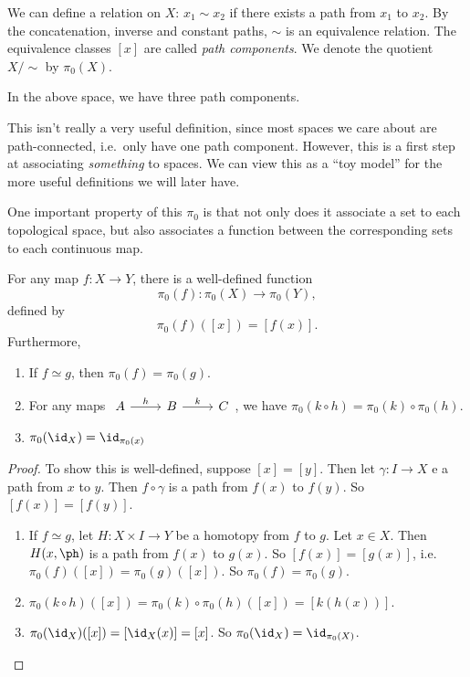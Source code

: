 \documentclass[a4paper]{article}
\begin{document}
\begin{defi}
  We can define a relation on $X$: $x_1 \sim x_2$ if there exists a path from $x_1$ to $x_2$. By the concatenation, inverse and constant paths, $\sim$ is an equivalence relation. The equivalence classes $[x]$ are called \emph{path components}. We denote the quotient $X/{\sim}$ by $\pi_0(X)$.
\end{defi}
\begin{center}
\end{center}
In the above space, we have three path components.

This isn't really a very useful definition, since most spaces we care about are path-connected, i.e.\ only have one path component. However, this is a first step at associating \emph{something} to spaces. We can view this as a ``toy model'' for the more useful definitions we will later have.

One important property of this $\pi_0$ is that not only does it associate a set to each topological space, but also associates a function between the corresponding sets to each continuous map.
\begin{prop}
  For any map $f: X\to Y$, there is a well-defined function
  \[
    \pi_0(f): \pi_0(X) \to \pi_0(Y),
  \]
  defined by
  \[
    \pi_0(f)([x]) = [f(x)].
  \]
  Furthermore,
  \begin{enumerate}
    \item If $f\simeq g$, then $\pi_0(f) = \pi_0(g)$.
    \item For any maps $\begin{tikzcd} A \ar[r, "h"] & B\ar[r, "k"] & C\end{tikzcd}$, we have $\pi_0(k\circ h) = \pi_0(k)\circ \pi_0 (h)$.
    \item $\pi_0(\id_X) = \id_{\pi_0(x)}$
  \end{enumerate}
\end{prop}

\begin{proof}
  To show this is well-defined, suppose $[x] = [y]$. Then let $\gamma: I \to X$ e a path from $x$ to $y$. Then $f \circ \gamma$ is a path from $f(x)$ to $f(y)$. So $[f(x)] = [f(y)]$.
  \begin{enumerate}
    \item If $f \simeq g$, let $H: X \times I \to Y$ be a homotopy from $f$ to $g$. Let $x \in X$. Then $H(x, \ph)$ is a path from $f(x)$ to $g(x)$. So $[f(x)] = [g(x)]$, i.e.\ $\pi_0(f)([x]) = \pi_0(g)([x])$. So $\pi_0(f) = \pi_0(g)$.
    \item $\pi_0(k \circ h)([x]) = \pi_0(k) \circ \pi_0(h)([x]) = [k(h(x))]$.
    \item $\pi_0(\id_X)([x]) = [\id_X(x)] = [x]$. So $\pi_0(\id_X) = \id_{\pi_0(X)}$.
  \end{enumerate}
\end{proof}
\end{document}
